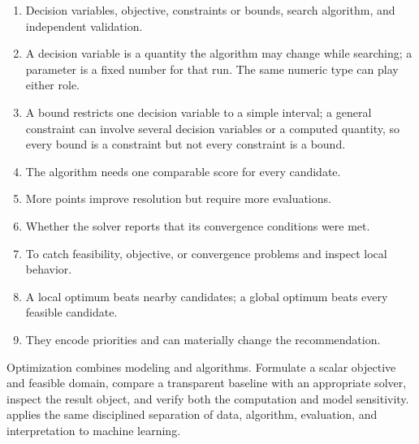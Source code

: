 \begin{enumerate}
    \item Decision variables, objective, constraints or bounds, search
          algorithm, and independent validation.
    \item A decision variable is a quantity the algorithm may change while
          searching; a parameter is a fixed number for that run. The same
          numeric type can play either role.
    \item A bound restricts one decision variable to a simple interval; a
          general constraint can involve several decision variables or a
          computed quantity, so every bound is a constraint but not every
          constraint is a bound.
    \item The algorithm needs one comparable score for every candidate.
    \item More points improve resolution but require more evaluations.
    \item Whether the solver reports that its convergence conditions were met.
    \item To catch feasibility, objective, or convergence problems and inspect
          local behavior.
    \item A local optimum beats nearby candidates; a global optimum beats every
          feasible candidate.
    \item They encode priorities and can materially change the recommendation.
\end{enumerate}

\begin{tcolorbox}[title=Chapter summary,colframe=orange,colback=white,arc=2mm]
Optimization combines modeling and algorithms. Formulate a scalar objective and
feasible domain, compare a transparent baseline with an appropriate solver,
inspect the result object, and verify both the computation and model sensitivity.
 applies the same disciplined separation of data,
algorithm, evaluation, and interpretation to machine learning.
\end{tcolorbox}
